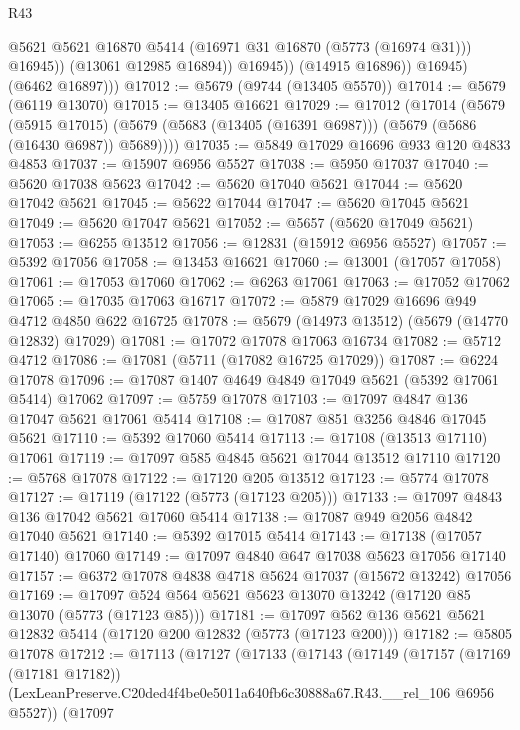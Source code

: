 \begin{lexlean}{R43}
\begin{coremodule}
                      @5621
                      @5621
                      @16870
                      @5414
                      (@16971 @31 @16870 (@5773 (@16974 @31)))
                      @16945))
                  (@13061 @12985 @16894))
                @16945))
            (@14915 @16896))
          @16945)
        (@6462 @16897)))
@17012 := @5679 (@9744 (@13405 @5570))
@17014 := @5679 (@6119 @13070)
@17015 := @13405 @16621
@17029 := @17012
    (@17014
      (@5679
        (@5915 @17015)
        (@5679 (@5683 (@13405 (@16391 @6987))) (@5679 (@5686 (@16430 @6987)) @5689))))
@17035 := @5849 @17029 @16696 @933 @120 @4833 @4853
@17037 := @15907 @6956 @5527
@17038 := @5950 @17037
@17040 := @5620 @17038 @5623
@17042 := @5620 @17040 @5621
@17044 := @5620 @17042 @5621
@17045 := @5622 @17044
@17047 := @5620 @17045 @5621
@17049 := @5620 @17047 @5621
@17052 := @5657 (@5620 @17049 @5621)
@17053 := @6255 @13512
@17056 := @12831 (@15912 @6956 @5527)
@17057 := @5392 @17056
@17058 := @13453 @16621
@17060 := @13001 (@17057 @17058)
@17061 := @17053 @17060
@17062 := @6263 @17061
@17063 := @17052 @17062
@17065 := @17035 @17063 @16717
@17072 := @5879 @17029 @16696 @949 @4712 @4850 @622 @16725
@17078 := @5679 (@14973 @13512) (@5679 (@14770 @12832) @17029)
@17081 := @17072 @17078 @17063 @16734
@17082 := @5712 @4712
@17086 := @17081 (@5711 (@17082 @16725 @17029))
@17087 := @6224 @17078
@17096 := @17087 @1407 @4649 @4849 @17049 @5621 (@5392 @17061 @5414) @17062
@17097 := @5759 @17078
@17103 := @17097 @4847 @136 @17047 @5621 @17061 @5414
@17108 := @17087 @851 @3256 @4846 @17045 @5621
@17110 := @5392 @17060 @5414
@17113 := @17108 (@13513 @17110) @17061
@17119 := @17097 @585 @4845 @5621 @17044 @13512 @17110
@17120 := @5768 @17078
@17122 := @17120 @205 @13512
@17123 := @5774 @17078
@17127 := @17119 (@17122 (@5773 (@17123 @205)))
@17133 := @17097 @4843 @136 @17042 @5621 @17060 @5414
@17138 := @17087 @949 @2056 @4842 @17040 @5621
@17140 := @5392 @17015 @5414
@17143 := @17138 (@17057 @17140) @17060
@17149 := @17097 @4840 @647 @17038 @5623 @17056 @17140
@17157 := @6372 @17078 @4838 @4718 @5624 @17037 (@15672 @13242) @17056
@17169 := @17097 @524 @564 @5621 @5623 @13070 @13242 (@17120 @85 @13070 (@5773 (@17123 @85)))
@17181 := @17097 @562 @136 @5621 @5621 @12832 @5414 (@17120 @200 @12832 (@5773 (@17123 @200)))
@17182 := @5805 @17078
@17212 := @17113
    (@17127
      (@17133
        (@17143
          (@17149
            (@17157
              (@17169 (@17181 @17182))
              (LexLeanPreserve.C20ded4f4be0e5011a640fb6c30888a67.R43.__rel_106 @6956 @5527))
            (@17097

\end{coremodule}
\end{lexlean}
